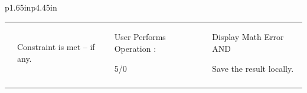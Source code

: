 \documentclass[12pt]{article}
\begin{document}
\begin{table}[H]
\begin{tabular}{p{1.65in}p{4.45in}}
{\begin{table}[H]
\begin{tabular}{p{1.36in}p{1.36in}p{1.36in}p{1.36in}}
\hhline{----}
\multicolumn{1}{|p{1.36in}}{T\_G-US6\_3} & 
\multicolumn{1}{|p{1.36in}}{Constraint is met – if any.} & 
\multicolumn{1}{|p{1.36in}}{User Performs Operation :  \par 5/0} & 
\multicolumn{1}{|p{1.36in}|}{\cellcolor[HTML]{FFFFFF}Display Math Error AND  \par Save the result locally. } \\
\hhline{----}

\end{tabular}
 \end{table}
\par } \\
\hhline{--}
 \\
\hhline{--}
 \\
\hhline{--}

\end{tabular}
 \end{table}
\end{document}
